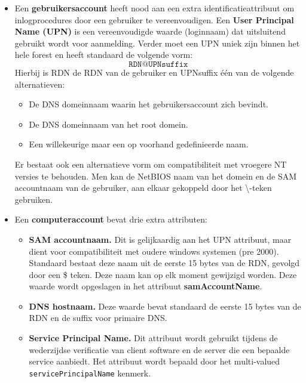 \begin{enumerate}
{			\begin{itemize}
				\item Een \textbf{gebruikersaccount} heeft nood aan een extra identificatieattribuut om inlogprocedures door een gebruiker te vereenvoudigen. Een \textbf{User Principal Name (UPN)} is een vereenvoudigde waarde (loginnaam) dat uitsluitend gebruikt wordt voor aanmelding. Verder moet een UPN uniek zijn binnen het hele forest en heeft standaard de volgende vorm:
				$$\texttt{RDN@UPNsuffix}$$
				Hierbij is RDN de RDN van de gebruiker en UPNsuffix één van de volgende alternatieven:
				\begin{itemize}
					\item De DNS domeinnaam waarin het gebruikersaccount zich bevindt.
					\item De DNS domeinnaam van het root domein.
					\item Een willekeurige maar een op voorhand gedefinieerde naam.
				\end{itemize}

				Er bestaat ook een alternatieve vorm om compatibiliteit met vroegere NT versies te behouden. Men kan de NetBIOS naam van het domein en de SAM accountnaam van de gebruiker, aan elkaar gekoppeld door het \textbackslash-teken gebruiken.  
				
				\item Een \textbf{computeraccount} bevat drie extra attributen:
				\begin{itemize}
					\item \textbf{SAM accountnaam.} Dit is gelijkaardig aan het UPN attribuut, maar dient voor compatibiliteit met oudere windows systemen (pre 2000). Standaard bestaat deze naam uit de eerste 15 bytes van de RDN, gevolgd door een \$ teken. Deze naam kan op elk moment gewijzigd worden. Deze waarde wordt opgeslagen in het attribuut \textbf{samAccountName}.
					\item \textbf{DNS hostnaam.} Deze waarde bevat standaard de eerste 15 bytes van de RDN en de suffix voor primaire DNS.
					\item \textbf{Service Principal Name.} Dit attribuut wordt gebruikt tijdens de wederzijdse verificatie van client software en de server die een bepaalde service aanbiedt. Het attribuut wordt bepaald door het multi-valued \texttt{servicePrincipalName} kenmerk.
				\end{itemize}
			\end{itemize}
		}
		
		 { 		
			
}
\end{enumerate}
